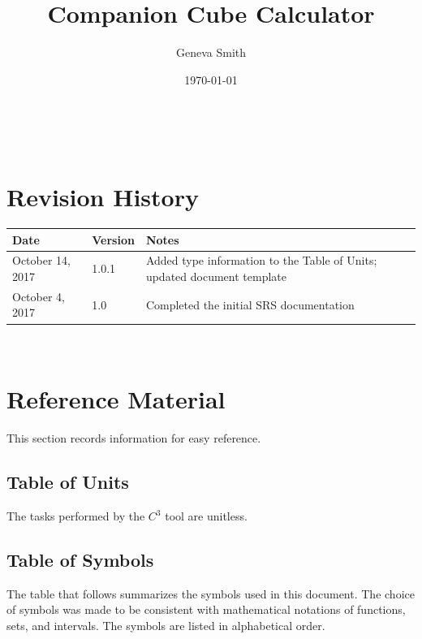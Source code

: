 \documentclass[12pt]{article}
\newcommand{\prognameAbbrv}{$C^{3}$}
\begin{document}
\title{Companion Cube Calculator} 
\author{Geneva Smith}
\date{\today}
	
\maketitle

~\newpage


\section{Revision History}

\begin{tabularx}{\textwidth}{p{3cm}p{2cm}X}
\toprule {\bf Date} & {\bf Version} & {\bf Notes}\\
\midrule
October 14, 2017 & 1.0.1 & Added type information to the Table of Units; 
updated document template \\
October 4, 2017 & 1.0 & Completed the initial SRS documentation\\
\bottomrule
\end{tabularx}

~\newpage

\section{Reference Material}

This section records information for easy reference.

\subsection{Table of Units}

The tasks performed by the \prognameAbbrv{} tool are unitless.

\subsection{Table of Symbols}

The table that follows summarizes the symbols used in this document. The choice 
of symbols was made to be consistent with mathematical notations of functions, 
sets, and intervals. The symbols are listed in alphabetical order.
\end{document}
